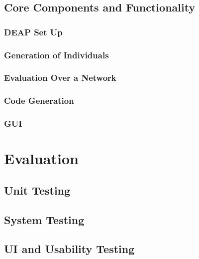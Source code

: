 \documentclass{l4proj}
\begin{document}
\section{Core Components and Functionality}

\subsection{DEAP Set Up}


\subsection{Generation of Individuals}


\subsection{Evaluation Over a Network}


\subsection{Code Generation}


\subsection{GUI}


\chapter{Evaluation}

\section{Unit Testing}

\section{System Testing}

\section{UI and Usability Testing}

\end{document}
